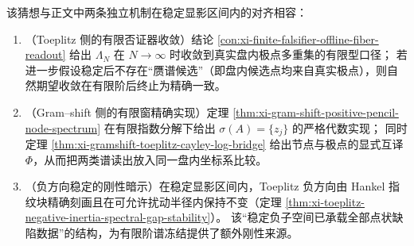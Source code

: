 \begin{remark}
该猜想与正文中两条独立机制在稳定显影区间内的对齐相容：
\begin{enumerate}
  \item \textnormal{（Toeplitz 侧的有限否证器收敛）}结论 \ref{con:xi-finite-falsifier-offline-fiber-readout} 给出 \(\Lambda_N\) 在 \(N\to\infty\) 时收敛到真实盘内极点多重集的有限型口径；
  若进一步假设稳定后不存在“赝谱候选”（即盘内候选点均来自真实极点），则自然期望收敛在有限阶后终止为精确一致。
  \item \textnormal{（Gram--shift 侧的有限窗精确实现）}定理 \ref{thm:xi-gram-shift-positive-pencil-node-spectrum} 在有限指数分解下给出
  \(\sigma(A)=\{z_j\}\) 的严格代数实现；
  同时定理 \ref{thm:xi-gramshift-toeplitz-cayley-log-bridge} 给出节点与极点的显式互译 \(\Phi\)，从而把两类谱读出放入同一盘内坐标系比较。
  \item \textnormal{（负方向稳定的刚性暗示）}在稳定显影区间内，Toeplitz 负方向由 Hankel 指纹块精确刻画且在可允许扰动半径内保持不变（定理 \ref{thm:xi-toeplitz-negative-inertia-spectral-gap-stability}）。
  该“稳定负子空间已承载全部点状缺陷数据”的结构，为有限阶谱冻结提供了额外刚性来源。
\end{enumerate}
\end{remark}
